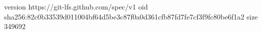 version https://git-lfs.github.com/spec/v1
oid sha256:82c0b33539d011004bf64d5be3c87f0a0d361cfb87fd7fe7cf3f9fc80be6f1a2
size 349692
